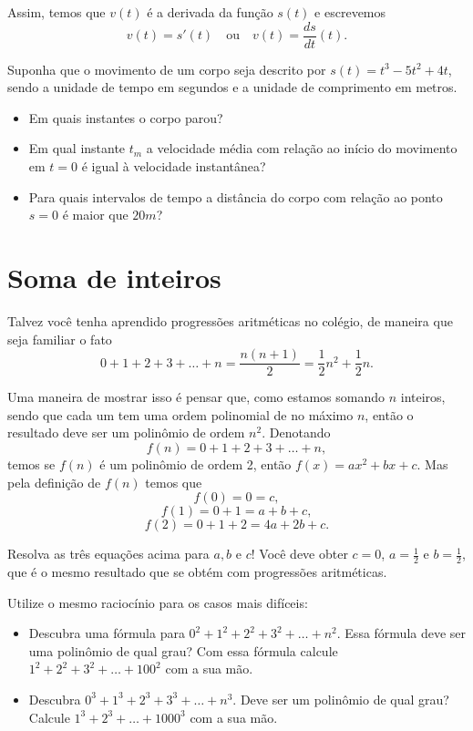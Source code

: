 \documentclass[a4paper,fleqn,12pt]{article}
\begin{document}
Assim, temos que $v(t)$ é a derivada da função $s(t)$ e escrevemos
$$
v(t) = s'(t) \quad \text{ou} \quad v(t) = \frac{ds}{dt}(t).
$$

Suponha que o movimento de um corpo seja descrito por $s(t) = t^3 - 5 t^2 + 4t$, sendo a unidade de tempo em segundos e a unidade de comprimento em metros.

\begin{itemize}
\item Em quais instantes o corpo parou?
\item Em qual instante $t_m$ a velocidade média com relação ao início do movimento em $t = 0$ é igual à velocidade instantânea?
\item Para quais intervalos de tempo a distância do corpo com relação ao ponto $s = 0$ é maior que $20 \unit{m}$?
\end{itemize}


\pagebreak

\section{Soma de inteiros}

Talvez você tenha aprendido progressões aritméticas no colégio, de maneira que seja familiar o fato
$$
0 + 1 + 2 + 3 + \ldots + n = \frac{n(n+1)}{2} = \frac{1}{2} n^2 + \frac{1}{2} n.
$$

Uma maneira de mostrar isso é pensar que, como estamos somando $n$ inteiros, sendo que cada um tem uma ordem polinomial de no máximo $n$, então o resultado deve ser um polinômio de ordem $n^2$. Denotando
$$
f(n) = 0 + 1 + 2 + 3 + \ldots + n,
$$
temos se $f(n)$ é um polinômio de ordem 2, então $f(x) = a x^2 + b x + c$. Mas pela definição de $f(n)$ temos que
$$
f(0) = 0 = c,
$$
$$
f(1) = 0 + 1 = a + b + c,
$$
$$
f(2) = 0 + 1 + 2 = 4 a + 2 b + c.
$$

Resolva as três equações acima para $a, b$ e $c$! Você deve obter $c = 0$, $a = \frac{1}{2}$ e $b = \frac{1}{2}$, que é o mesmo resultado que se obtém com progressões aritméticas.

\n

Utilize o mesmo raciocínio para os casos mais difíceis:

\begin{itemize}
\item Descubra uma fórmula para $0^2 + 1^2 + 2^2 + 3^2 + \ldots + n^2$. Essa fórmula deve ser uma polinômio de qual grau? Com essa fórmula calcule $1^2 + 2^2 + 3^2 + \ldots + 100^2$ com a sua mão.
\item Descubra $0^3 + 1^3 + 2^3 + 3^3 + \ldots + n^3$. Deve ser um polinômio de qual grau? Calcule $1^3 + 2^3 + \ldots + 1000^3$ com a sua mão.
\end{itemize}
\end{document}
